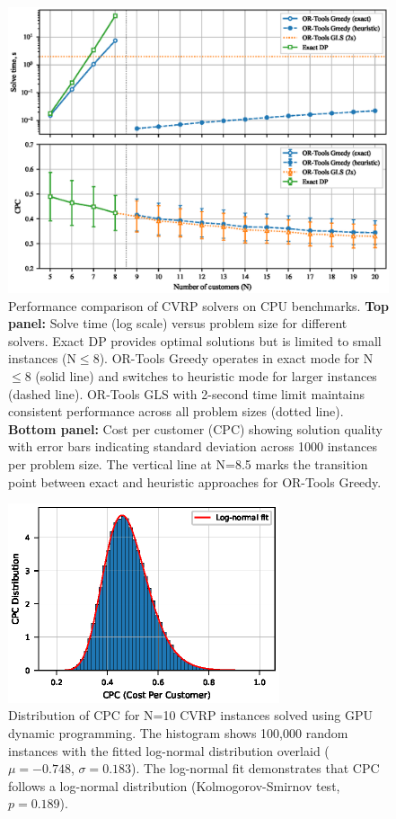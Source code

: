 \documentclass[a4paper,twoside]{article}
\begin{document}
\begin{figure}[t!]
\centering
   \includegraphics[width=160mm]{figures/benchmark.eps}
   \caption{Performance comparison of CVRP solvers on CPU benchmarks. 
       \textbf{Top panel:} Solve time (log scale) versus problem size for different solvers. 
       Exact DP provides optimal solutions but is limited to small instances (N$\leq$8). 
       OR-Tools Greedy operates in exact mode for N$\leq$8 (solid line) and switches to heuristic mode for larger instances (dashed line). 
       OR-Tools GLS with 2-second time limit maintains consistent performance across all problem sizes (dotted line). 
       \textbf{Bottom panel:} Cost per customer (CPC) showing solution quality with error bars indicating standard deviation across 1000 instances per problem size. 
       The vertical line at N=8.5 marks the transition point between exact and heuristic approaches for OR-Tools Greedy.}
\label{fig:benchmark}
\end{figure}

\begin{figure}[t!]
\centering
   \includegraphics[width=80mm]{figures/cpc_histogram_paper_100k.eps}
   \caption{Distribution of CPC for N=10 CVRP instances solved using GPU dynamic programming. The histogram shows 100,000 random instances with the fitted log-normal distribution overlaid ($\mu=-0.748$, $\sigma=0.183$). The log-normal fit demonstrates that CPC follows a log-normal distribution (Kolmogorov-Smirnov test, $p=0.189$).}
\label{fig:benchmark}
\end{figure}
\end{document}

